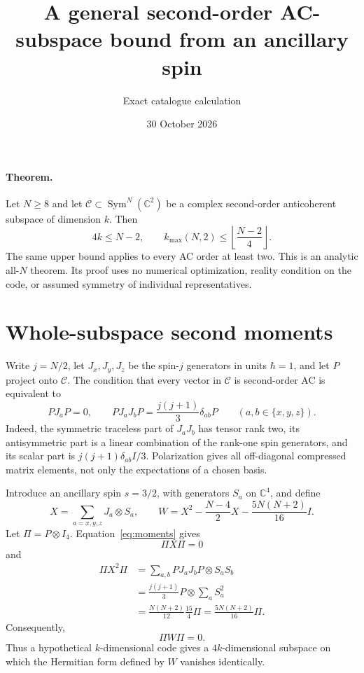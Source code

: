 \documentclass[11pt]{article}
\begin{document}
\title{A general second-order AC-subspace bound from an ancillary spin}
\author{Exact catalogue calculation}
\date{30 October 2026}
\maketitle

\paragraph{Theorem.}
Let $N\ge8$ and let $\mathcal C\subset\operatorname{Sym}^N(\mathbb C^2)$ be a complex second-order anticoherent subspace of dimension $k$. Then
\[
\boxed{4k\le N-2,\qquad k_{\max}(N,2)\le\left\lfloor\frac{N-2}{4}\right\rfloor.}
\]
The same upper bound applies to every AC order at least two. This is an analytic all-$N$ theorem. Its proof uses no numerical optimization, reality condition on the code, or assumed symmetry of individual representatives.

\section{Whole-subspace second moments}
Write $j=N/2$, let $J_x,J_y,J_z$ be the spin-$j$ generators in units $\hbar=1$, and let $P$ project onto $\mathcal C$. The condition that every vector in $\mathcal C$ is second-order AC is equivalent to
\begin{equation}\label{eq:moments}
PJ_aP=0,\qquad PJ_aJ_bP=\frac{j(j+1)}{3}\delta_{ab}P
\qquad(a,b\in\{x,y,z\}).
\end{equation}
Indeed, the symmetric traceless part of $J_aJ_b$ has tensor rank two, its antisymmetric part is a linear combination of the rank-one spin generators, and its scalar part is $j(j+1)\delta_{ab}I/3$. Polarization gives all off-diagonal compressed matrix elements, not only the expectations of a chosen basis.

Introduce an ancillary spin $s=3/2$, with generators $S_a$ on $\mathbb C^4$, and define
\[
X=\sum_{a=x,y,z}J_a\otimes S_a,
\qquad
W=X^2-\frac{N-4}{2}X-\frac{5N(N+2)}{16}I.
\]
Let $\Pi=P\otimes I_4$. Equation~\eqref{eq:moments} gives
\[
\Pi X\Pi=0
\]
and
\begin{align*}
\Pi X^2\Pi
&=\sum_{a,b}PJ_aJ_bP\otimes S_aS_b\\
&=\frac{j(j+1)}{3}P\otimes\sum_aS_a^2\\
&=\frac{N(N+2)}{12}\frac{15}{4}\Pi
=\frac{5N(N+2)}{16}\Pi.
\end{align*}
Consequently,
\begin{equation}\label{eq:nullcompression}
\boxed{\Pi W\Pi=0.}
\end{equation}
Thus a hypothetical $k$-dimensional code gives a $4k$-dimensional subspace on which the Hermitian form defined by $W$ vanishes identically.
\end{document}
